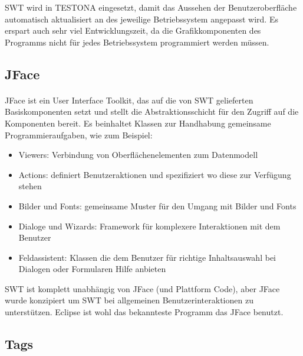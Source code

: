 SWT wird in TESTONA eingesetzt, damit das Aussehen der Benutzeroberfläche automatisch aktualisiert an des jeweilige Betriebssystem angepasst wird. Es erspart auch sehr viel Entwicklungszeit, da die Grafikkomponenten des Programms nicht für jedes Betriebssystem programmiert werden müssen.





\subsection{JFace}
\paragraph{}
JFace ist ein User Interface Toolkit, das auf die von SWT gelieferten Basiskomponenten setzt und stellt die Abstraktionsschicht für den Zugriff auf die Komponenten bereit. Es beinhaltet Klassen zur Handhabung gemeinsame Programmieraufgaben, wie zum Beispiel:


\begin{itemize}
\item Viewers: Verbindung von Oberflächenelementen zum Datenmodell
\item Actions: definiert Benutzeraktionen und spezifiziert wo diese zur Verfügung stehen
\item Bilder und Fonts: gemeinsame Muster für den Umgang mit Bilder und Fonts
\item Dialoge und Wizards: Framework für komplexere Interaktionen mit dem Benutzer
\item Feldassistent: Klassen die dem Benutzer für richtige Inhaltsauswahl bei Dialogen oder Formularen Hilfe anbieten
\end{itemize}


SWT ist komplett unabhängig von JFace (und Plattform Code), aber JFace wurde konzipiert um SWT  bei allgemeinen Benutzerinteraktionen zu unterstützen. Eclipse ist wohl das bekannteste Programm das JFace benutzt.\cite{EclipseHelp}\\



\subsection{Tags}\label{sub.Tags}
\paragraph{}

